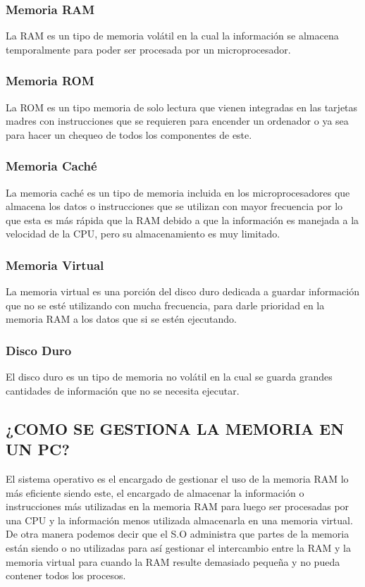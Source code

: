 \documentclass{article}
\begin{document}
\subsubsection{Memoria RAM}
{\raggedleft
La RAM es un tipo de memoria volátil en la cual la información se almacena temporalmente para poder ser procesada por un microprocesador.
}
\subsubsection{Memoria ROM}
{\raggedleft
La ROM es un tipo memoria de solo lectura que vienen integradas en las tarjetas madres con instrucciones que se requieren para encender un ordenador o ya sea para hacer un chequeo de todos los componentes de este.\cite{tutorialspoint}
}
\subsubsection{Memoria Caché}
{\raggedleft
La memoria caché es un tipo de memoria incluida en los microprocesadores que almacena los datos o instrucciones que se utilizan con mayor frecuencia por lo que esta es más rápida que la RAM debido a que la información es manejada a la velocidad de la CPU, pero su almacenamiento es muy limitado.\cite{tutorialspoint}
}
\subsubsection{Memoria Virtual}
{\raggedleft
La memoria virtual es una porción del disco duro dedicada a guardar información que no se esté utilizando con mucha frecuencia, para darle prioridad en la memoria RAM a los datos que si se estén ejecutando.\cite{tallermemoria}
}
\subsubsection{Disco Duro}
{\raggedleft
El disco duro es un tipo de memoria no volátil en la cual se guarda grandes cantidades de información que no se necesita ejecutar.
}

\subsection{¿COMO SE GESTIONA LA MEMORIA EN UN PC?}
{\raggedleft
El sistema operativo es el encargado de gestionar el uso de la memoria RAM lo más eficiente siendo este, el encargado de almacenar la información o instrucciones más utilizadas en la memoria RAM para luego ser procesadas por una CPU y la información menos utilizada almacenarla en una memoria virtual.
De otra manera podemos decir que el S.O administra que partes de la memoria están siendo o no utilizadas para así gestionar el intercambio entre la RAM y la memoria virtual para cuando la RAM resulte demasiado pequeña y no pueda contener todos los procesos.\cite{gestionmemoria}
}
\end{document}
